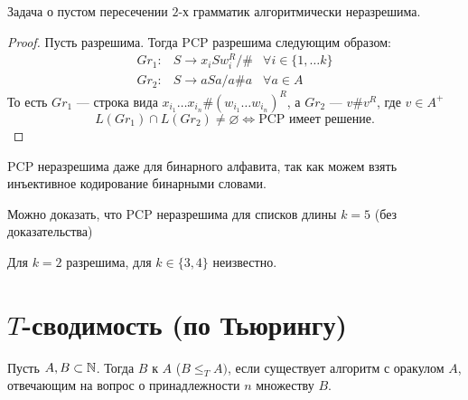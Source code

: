 \begin{cor}
    Задача о пустом пересечении $ 2$-х грамматик алгоритмически неразрешима.
\end{cor}
\begin{proof}
	Пусть разрешима. Тогда  PCP разрешима следующим образом:
	\[
	\begin{aligned}
		Gr_1 \colon& S \to  x_i S w_i^R / \# & \forall i \in \{1, \ldots k\} \\
		Gr_2 \colon& S \to  a S a / a\#a & \forall a \in A
	\end{aligned}
	\]
	То есть $ Gr_1$ --- строка вида $  x_{i_1} \ldots x_{i_n} \# (w_{i_1}\ldots w_{i_{n}})^{R}$, а  $ Gr_2$ --- $ v\#v ^{R}$, где $ v \in A^{+}$
	\[
		L(Gr_1) \cap L(Gr_2) \ne  \varnothing \Longleftrightarrow \text{PCP имеет решение}
	.\] 
\end{proof}

\begin{note}
    PCP неразрешима даже для бинарного алфавита, так как можем взять инъективное кодирование бинарными словами.
\end{note}
\begin{note}
	Можно доказать, что PCP неразрешима для списков длины $ k = 5$ (без доказательства)
\end{note}
\begin{note}
    Для $k= 2$ разрешима, для $ k \in \{3, 4\}$ неизвестно.
\end{note}

\section{$T$-сводимость (по Тьюрингу)}
\begin{defn} 
	Пусть $ A, B \subset \mathbb{N}$. Тогда $ B$  к $ A$ ($ B \le _{T}  A)$, если существует алгоритм с оракулом $ A$, отвечающим на вопрос о принадлежности  $ n $ множеству $ B$.
\end{defn}


